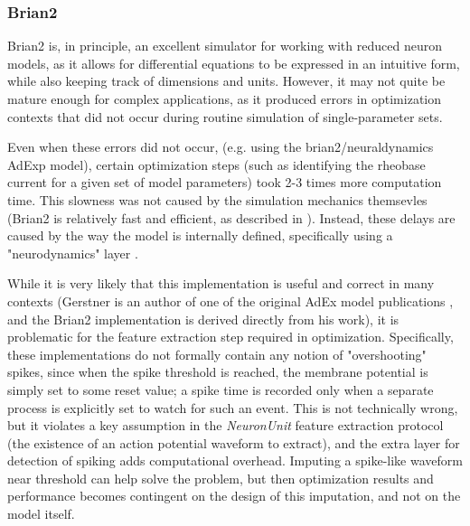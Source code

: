 \subsubsection{Brian2}
Brian2 \cite{stimberg2019brian} is, in principle, an excellent simulator for working with reduced neuron models, as it allows for differential equations to be expressed in an intuitive form, while also keeping track of dimensions and units.
However, it may not quite be mature enough for complex applications, as it produced errors in optimization contexts that did not occur during routine simulation of single-parameter sets.

Even when these errors did not occur, (e.g. using the brian2/neuraldynamics AdExp model), certain optimization steps (such as identifying the rheobase current for a given set of model parameters) took 2-3 times more computation time.
This slowness was not caused by the simulation mechanics themsevles (Brian2 is relatively fast and efficient, as described in \cite{stimberg2019brian}).
Instead, these delays are caused by the way the model is internally defined, specifically using a
"neurodynamics" layer \cite{gerstner2014neuronal}.

While it is very likely that this implementation is useful and correct in many contexts (Gerstner is an author of one of the original AdEx model publications \cite{brette2005adaptive}, and the Brian2 implementation is derived directly from his work), it is problematic for the feature extraction step required in optimization.
Specifically, these implementations do not formally contain any notion of "overshooting" spikes, since when the spike threshold is reached, the membrane potential is simply set to some reset value; a spike time is recorded only when a separate process is explicitly set to watch for such an event.
This is not technically wrong, but it violates a key assumption in the \emph{NeuronUnit} feature extraction protocol (the existence of an action potential waveform to extract), and the extra layer for detection of spiking adds computational overhead.
Imputing a spike-like waveform near threshold can help solve the problem, but then optimization results and performance becomes contingent on the design of this imputation, and not on the model itself.

